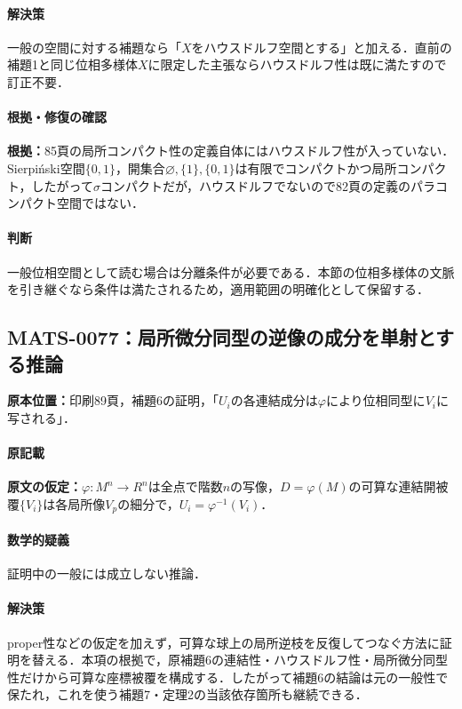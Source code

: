 \documentclass[a4paper,10pt]{ltjsarticle}
\begin{document}
\paragraph{解決策}一般の空間に対する補題なら「$X$をハウスドルフ空間とする」と加える．直前の補題1と同じ位相多様体$X$に限定した主張ならハウスドルフ性は既に満たすので訂正不要．

\paragraph{根拠・修復の確認}\textbf{根拠：}85頁の局所コンパクト性の定義自体にはハウスドルフ性が入っていない．Sierpiński空間$\{0,1\}$，開集合$\varnothing,\{1\},\{0,1\}$は有限でコンパクトかつ局所コンパクト，したがって$\sigma$コンパクトだが，ハウスドルフでないので82頁の定義のパラコンパクト空間ではない．

\paragraph{判断}一般位相空間として読む場合は分離条件が必要である．本節の位相多様体の文脈を引き継ぐなら条件は満たされるため，適用範囲の明確化として保留する．


\subsection*{MATS-0077：局所微分同型の逆像の成分を単射とする推論}\label{math:MATS-0077}
\noindent\textbf{原本位置：}印刷89頁，補題6の証明，「$U_i$の各連結成分は$\varphi$により位相同型に$V_i$に写される」．

\paragraph{原記載}\textbf{原文の仮定：}$\varphi:M^n\to R^n$は全点で階数$n$の写像，$D=\varphi(M)$の可算な連結開被覆$\{V_i\}$は各局所像$V_p$の細分で，$U_i=\varphi^{-1}(V_i)$．

\paragraph{数学的疑義}証明中の一般には成立しない推論．

\paragraph{解決策}proper性などの仮定を加えず，可算な球上の局所逆枝を反復してつなぐ方法に証明を替える．本項の根拠で，原補題6の連結性・ハウスドルフ性・局所微分同型性だけから可算な座標被覆を構成する．したがって補題6の結論は元の一般性で保たれ，これを使う補題7・定理2の当該依存箇所も継続できる．
\end{document}
